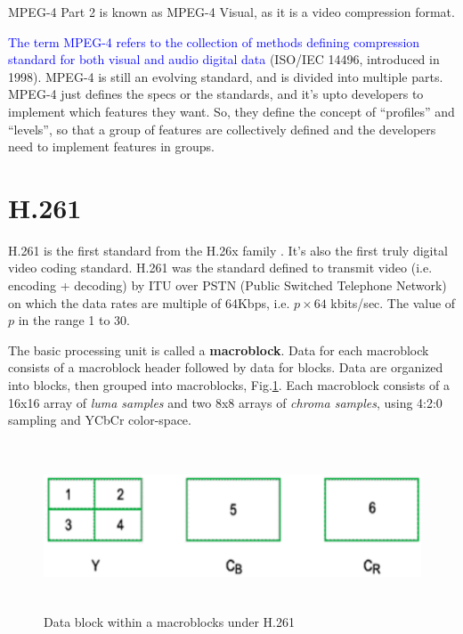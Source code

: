 MPEG-4 Part 2 is known as MPEG-4 Visual, as it is a video compression format.

\begin{framed}
\textcolor{blue}{The term MPEG-4 refers to the collection of methods defining
compression standard for both visual and audio digital data} (ISO/IEC 14496,
introduced in 1998). MPEG-4 is still an evolving standard, and is divided into
multiple parts. MPEG-4 just defines the specs or the standards, and it's upto
developers to implement which features they want. So, they define the concept of
``profiles'' and ``levels'', so that a group of features are collectively
defined and the developers need to implement features in groups.

\end{framed}


\section{H.261}
\label{sec:H.261}

H.261 is the first standard from the H.26x family \citep{vetrivel2010}. It's
also the first truly digital video coding standard. H.261
was the standard defined to transmit video (i.e. encoding + decoding) by ITU
over PSTN (Public Switched Telephone Network) on which the data rates are
multiple of 64Kbps, i.e. $p\times 64$ kbits/sec. The value of $p$ in the range 1
to 30. 

The basic processing unit is called a {\bf macroblock}. Data for each macroblock
consists of a macroblock header followed by data for blocks. Data are organized
into blocks, then grouped into macroblocks, Fig.\ref{fig:YCbCr_H261}. Each
macroblock consists of a 16x16 array of {\it luma samples} and two 8x8 arrays of
{\it chroma samples}, using 4:2:0 sampling and YCbCr color-space.

\begin{figure}[hbt]
  \centerline{\includegraphics[height=5cm,
    angle=0]{./images/YCbCr_H261.eps}}
\caption{Data block within a macroblocks under H.261}
\label{fig:YCbCr_H261}
\end{figure}

